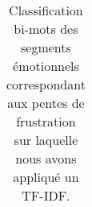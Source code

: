 \begin{table}[]
\begin{tabular}{|l|l|l|}
 \hline
\end{tabular}
\caption{Classification bi-mots des segments émotionnels correspondant aux pentes de frustration sur laquelle nous avons appliqué un TF-IDF.}
\label{tab:kmeans}
\end{table}
